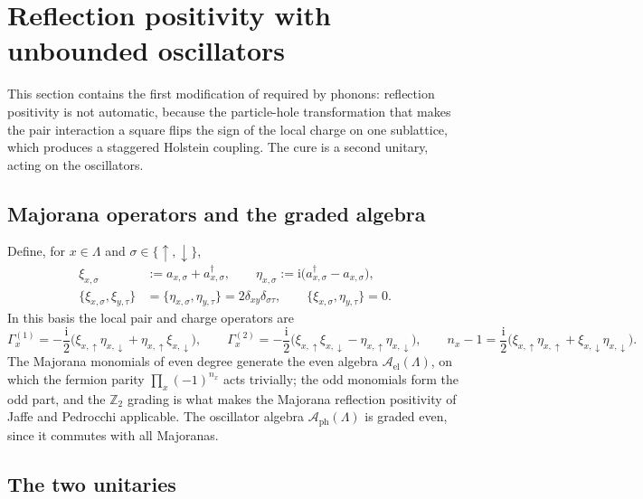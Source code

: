 \documentclass[11pt]{article}
\numberwithin{equation}{section}
\newcommand{\ii}{\mathrm{i}}
\newcommand{\Z}{\mathbb{Z}}
\newcommand{\Lamb}{\Lambda}
\newcommand{\ph}{\mathrm{ph}}
\newcommand{\Gam}{\Gamma}
\theoremstyle{definition}
\begin{document}
\section{Reflection positivity with unbounded oscillators}\label{sec:rp}

This section contains the first modification of \cite{rens2026pkodlro} required by
phonons: reflection positivity is not automatic, because the particle-hole
transformation that makes the pair interaction a square flips the sign of the local
charge on one sublattice, which produces a staggered Holstein coupling. The cure is a
second unitary, acting on the oscillators.

\subsection{Majorana operators and the graded algebra}

Define, for $x\in\Lamb$ and $\sigma\in\{\uparrow,\downarrow\}$,
\begin{equation}
\begin{aligned}
\xi_{x,\sigma}&:=a_{x,\sigma}+a_{x,\sigma}^{\dagger},\qquad
\eta_{x,\sigma}:=\ii\big(a_{x,\sigma}^{\dagger}-a_{x,\sigma}\big),\\
\{\xi_{x,\sigma},\xi_{y,\tau}\}&=\{\eta_{x,\sigma},\eta_{y,\tau}\}=2\delta_{xy}\delta_{\sigma\tau},\qquad
\{\xi_{x,\sigma},\eta_{y,\tau}\}=0 .
\end{aligned}
\label{eq:maj}
\end{equation}
In this basis the local pair and charge operators are
\begin{equation}
\Gam^{(1)}_{x}=-\frac{\ii}{2}\big(\xi_{x,\uparrow}\eta_{x,\downarrow}+\eta_{x,\uparrow}\xi_{x,\downarrow}\big),\qquad
\Gam^{(2)}_{x}=-\frac{\ii}{2}\big(\xi_{x,\uparrow}\xi_{x,\downarrow}-\eta_{x,\uparrow}\eta_{x,\downarrow}\big),\qquad
n_{x}-1=\frac{\ii}{2}\big(\xi_{x,\uparrow}\eta_{x,\uparrow}+\xi_{x,\downarrow}\eta_{x,\downarrow}\big).
\label{eq:maj-gamma}
\end{equation}
The Majorana monomials of even degree generate the even algebra
$\mathcal{A}_{\mathrm{el}}(\Lamb)$, on which the fermion parity
$\prod_{x}(-1)^{n_{x}}$ acts trivially; the odd monomials form the odd part, and the
$\Z_{2}$ grading is what makes the Majorana reflection positivity of Jaffe and
Pedrocchi \cite{jaffe2015a,jaffe2015b} applicable. The oscillator algebra
$\mathcal{A}_{\ph}(\Lamb)$ is graded even, since it commutes with all Majoranas.

\subsection{The two unitaries}
\end{document}

